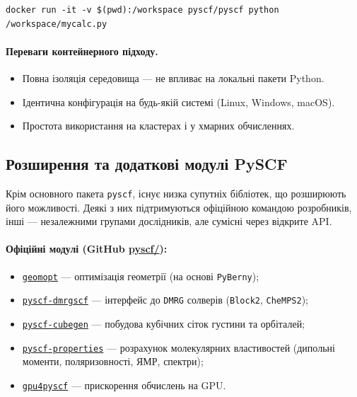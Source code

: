\begin{verbatim}
docker run -it -v $(pwd):/workspace pyscf/pyscf python /workspace/mycalc.py
\end{verbatim}

\paragraph{Переваги контейнерного підходу.}
\begin{itemize}
  \item Повна ізоляція середовища --- не впливає на локальні пакети Python.
  \item Ідентична конфігурація на будь-якій системі (Linux, Windows, macOS).
  \item Простота використання на кластерах і у хмарних обчисленнях.
\end{itemize}


\subsection{Розширення та додаткові модулі PySCF}

Крім основного пакета \texttt{pyscf}, існує низка супутніх бібліотек, що розширюють його можливості.
Деякі з них підтримуються офіційною командою розробників, інші — незалежними групами дослідників,
але сумісні через відкрите API.

\paragraph{Офіційні модулі \PySCF{} (GitHub \href{https://github.com/pyscf}{pyscf/}):}
\begin{itemize}
  \item \href{https://pyscf.org/interface/geomopt.html}{\texttt{geomopt}} — оптимізація геометрії (на основі \texttt{PyBerny});
  \item \href{https://github.com/pyscf/dmrgscf}{\texttt{pyscf-dmrgscf}} — інтерфейс до \texttt{DMRG} солверів (\texttt{Block2}, \texttt{CheMPS2});
  \item \href{https://github.com/pyscf/cubegen}{\texttt{pyscf-cubegen}} — побудова кубічних сіток густини та орбіталей;
  \item \href{https://github.com/pyscf/properties}{\texttt{pyscf-properties}} — розрахунок молекулярних властивостей (дипольні моменти, поляризовності, ЯМР, спектри);
  \item \href{https://github.com/pyscf/gpu4pyscf}{\texttt{gpu4pyscf}} — прискорення обчислень на GPU.
\end{itemize}


